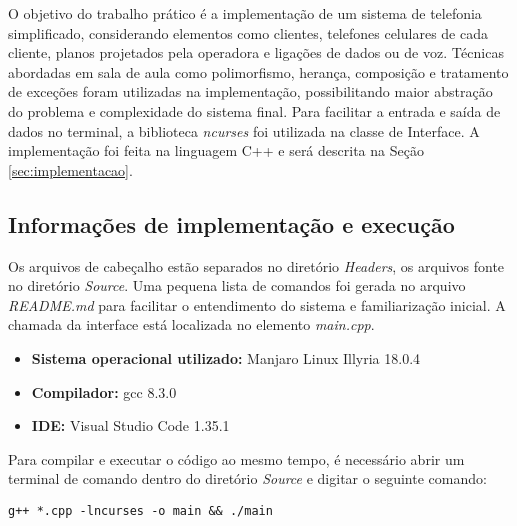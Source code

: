 O objetivo do trabalho prático é a implementação de um sistema de telefonia simplificado, considerando elementos como clientes, telefones celulares de cada cliente, planos projetados pela operadora e ligações de dados ou de voz. Técnicas abordadas em sala de aula como polimorfismo, herança, composição e tratamento de exceções foram utilizadas na implementação, possibilitando maior abstração do problema e complexidade do sistema final. Para facilitar a entrada e saída de dados no terminal, a biblioteca \textit{ncurses} foi utilizada na classe de Interface. A implementação foi feita na linguagem C++ e será descrita na Seção \ref{sec:implementacao}. 

\subsection{Informações de implementação e execução}
Os arquivos de cabeçalho estão separados no diretório \textit{Headers}, os arquivos fonte no diretório \textit{Source}. Uma pequena lista de comandos foi gerada no arquivo \textit{README.md} para facilitar o entendimento do sistema e familiarização inicial. A chamada da interface está localizada no elemento \textit{main.cpp}. 

\begin{itemize}
	\item \textbf{Sistema operacional utilizado:} Manjaro Linux Illyria 18.0.4
	\item \textbf{Compilador:} gcc 8.3.0 
	\item \textbf{IDE:} Visual Studio Code 1.35.1
\end{itemize}

Para compilar e executar o código ao mesmo tempo, é necessário abrir um terminal de comando dentro do diretório \textit{Source} e digitar o seguinte comando:

\texttt{g++ *.cpp -lncurses -o main \&\& ./main}


